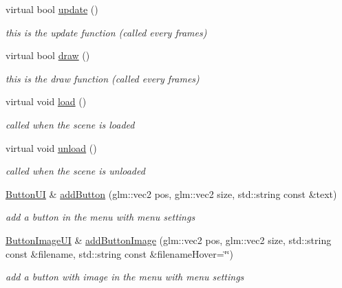 \begin{DoxyCompactItemize}
virtual bool \hyperlink{class_a_scene_menu_a1deeb5fd9be97376998cd2af36f29744}{update} ()
\begin{DoxyCompactList}\small\item\em this is the update function (called every frames) \end{DoxyCompactList}\item 
virtual bool \hyperlink{class_a_scene_menu_a5c11f34c83f025e1181219bf25ce4694}{draw} ()
\begin{DoxyCompactList}\small\item\em this is the draw function (called every frames) \end{DoxyCompactList}\item 
\mbox{\label{class_a_scene_menu_a85a4451f4fb6a3ae7a66f1296800d11e}} 
virtual void \hyperlink{class_a_scene_menu_a85a4451f4fb6a3ae7a66f1296800d11e}{load} ()
\begin{DoxyCompactList}\small\item\em called when the scene is loaded \end{DoxyCompactList}\item 
\mbox{\label{class_a_scene_menu_ad493937ca0d8ec4d710307593c0e77c1}} 
virtual void \hyperlink{class_a_scene_menu_ad493937ca0d8ec4d710307593c0e77c1}{unload} ()
\begin{DoxyCompactList}\small\item\em called when the scene is unloaded \end{DoxyCompactList}\item 
\hyperlink{class_button_u_i}{Button\+UI} \& \hyperlink{class_a_scene_menu_a20622fb8d15a21b407d4832e66162cbb}{add\+Button} (glm\+::vec2 pos, glm\+::vec2 size, std\+::string const \&text)
\begin{DoxyCompactList}\small\item\em add a button in the menu with menu settings \end{DoxyCompactList}\item 
\hyperlink{class_button_image_u_i}{Button\+Image\+UI} \& \hyperlink{class_a_scene_menu_a227d6b26f1933a6d4713075181ee0dd6}{add\+Button\+Image} (glm\+::vec2 pos, glm\+::vec2 size, std\+::string const \&filename, std\+::string const \&filename\+Hover=\char`\"{}\char`\"{})
\begin{DoxyCompactList}\small\item\em add a button with image in the menu with menu settings \end{DoxyCompactList}\item 

\end{DoxyCompactItemize}
